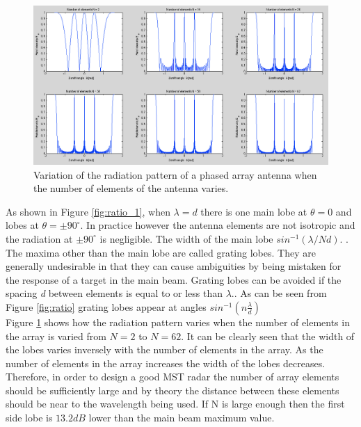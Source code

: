 \documentclass{article}
\begin{document}
\begin{figure}[h!]
\centering
\includegraphics[width=\textwidth]{Figures/elements.png}
\caption{Variation of the radiation pattern of a phased array antenna when the number of elements of the antenna varies.}
\label{fig:elements}
\end{figure}

As shown in Figure \ref{fig:ratio_1}, when $\lambda = d$ there is one main lobe at $\theta = 0$ and lobes at $\theta =  \pm 90^{\circ}$.  In practice however the antenna elements are not isotropic and the radiation at $\pm 90^{\circ}$ is negligible. The width of the main lobe $sin^{-1}(\lambda/Nd)$. \cite{Rottger:2000ip}. The maxima other than the main lobe are called grating lobes. They are generally undesirable in that they can cause ambiguities by being mistaken for the response of a target in the main beam. Grating lobes can be avoided if the spacing \textit{d} between elements is equal to or less than $\lambda$.\cite{Skolnik:2001irs}. As can be seen from Figure \ref{fig:ratio} grating lobes appear at angles $sin^{-1}(n\frac{\lambda}{d})$ \cite{Rottger:2000ip}\\

Figure \ref{fig:elements} shows how the radiation pattern varies when the number of elements in the array is varied from $N = 2$ to $N = 62$. It can be clearly seen that the width of the lobes varies inversely with the number of elements in the array. As the number of elements in the array increases the width of the lobes decreases.\\

Therefore, in order to design a good MST radar the number of array elements should be sufficiently large and by theory the distance between these elements should be near to the wavelength being used. If N is large enough then the first side lobe is $13.2 dB$ lower than the main beam maximum value.\cite{Skolnik:2001irs}\\
\end{document}
